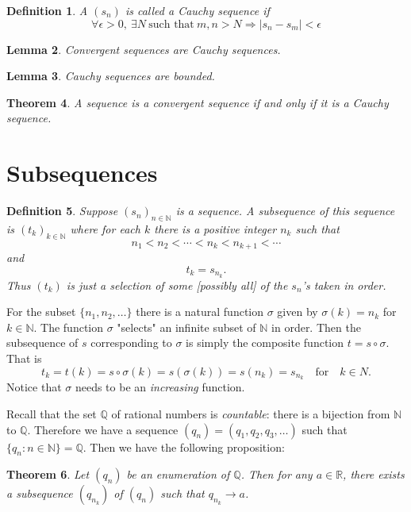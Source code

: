 \documentclass[12pt, lettersize]{book}
\newtheorem{thm}{Theorem}[section]
\newtheorem{dfn}[thm]{Definition}
\newtheorem{lem}[thm]{Lemma}
\newcommand{\R}{\mathbb{R}}
\newcommand{\N}{\mathbb{N}}
\newcommand{\Q}{\mathbb{Q}}
\begin{document}
	\begin{dfn}\label{def:cauchy-seq}
		A $(s_n)$ is called a \emph{Cauchy sequence} if 
		\begin{displaymath}
			\forall\epsilon>0,\ \exists N\ \text{such that}\ m,n>N\Rightarrow|s_n-s_m|<\epsilon
		\end{displaymath}
	\end{dfn}
	\begin{lem}
		Convergent sequences are Cauchy sequences.
	\end{lem}
	
	\begin{lem}
		Cauchy sequences are bounded.
	\end{lem}
	
	\begin{thm}\label{def:cauchy iff convergent}
		A sequence is a convergent sequence if and only if it is a Cauchy sequence.
	\end{thm}
	\newpage
	
	\section{Subsequences}
	\begin{dfn}
		Suppose $(s_n)_{n\in\mathbb{N}}$ is a sequence. A \emph{subsequence} of this sequence is $(t_k)_{k\in\mathbb{N}}$ where for each $k$ there is a positive integer $n_k$ such that
		\begin{equation*}
			n_1<n_2<\cdots<n_k<n_{k+1}<\cdots
		\end{equation*}
		and
		\begin{equation*}
			t_k=s_{n_k}.
		\end{equation*}
		Thus $(t_k)$ is just a selection of some [possibly all] of the $s_n$'s taken in order.
	\end{dfn}
	For the subset $\{n_1,n_2,\dots\}$ there is a natural function $\sigma$ given by $\sigma(k)=n_k$ for $k\in\mathbb{N}$. The function $\sigma$ "selects" an infinite subset of $\mathbb{N}$ in order. Then
	the subsequence of $s$ corresponding to $\sigma$ is simply the composite function $t=s\circ\sigma$. That is
	\begin{displaymath}
		t_k=t(k)=s\circ\sigma(k)=s(\sigma(k))=s(n_k)=s_{n_k}\quad\text{for}\quad k\in N.
	\end{displaymath}
	Notice that $\sigma$ needs to be an \emph{increasing} function.
	 
	Recall that the set $\Q$ of rational numbers is \emph{countable}: there is a bijection from $\N$ to $\Q$. Therefore we have a sequence $(q_n)=(q_1,q_2,q_3,\dots)$ such that $\{q_n: n\in\N\}=\Q$. Then we have the following proposition:
	\begin{thm}
		Let $(q_n)$ be an enumeration of $\Q$. Then for any $a\in\R$, there exists a subsequence $(q_{n_k})$ of $(q_n)$ such that $q_{n_k}\rightarrow a$.
	\end{thm}
\end{document}
